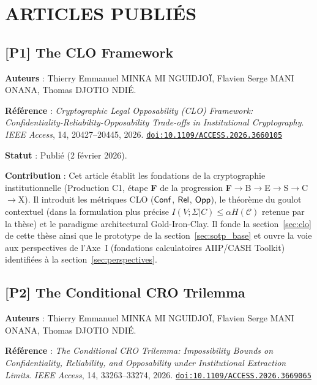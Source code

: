\section{ARTICLES PUBLI\'ES}
\label{sec:publications_publies}
\begin{sloppypar}
\subsection{[P1] The CLO Framework}

\noindent\textbf{Auteurs} : Thierry Emmanuel MINKA MI NGUIDJO\"{I},
Flavien Serge MANI ONANA, Thomas DJOTIO NDI\'E.

\noindent\textbf{R\'ef\'erence} : \textit{Cryptographic Legal Opposability (CLO) 
Framework: Confidentiality-Reliability-Opposability Trade-offs in Institutional 
Cryptography}. \textit{IEEE Access}, 14, 20427--20445, 2026.
\href{https://doi.org/10.1109/ACCESS.2026.3660105}{\texttt{doi:10.1109/ACCESS.2026.3660105}}

\noindent\textbf{Statut} : Publi\'e (2 f\'evrier 2026).

\noindent\textbf{Contribution} : Cet article \'etablit les fondations de la 
cryptographie institutionnelle (Production C1, \'etape \textbf{F} de la progression
\textbf{F}$\to$B$\to$E$\to$S$\to$C$\to$X). Il introduit les m\'etriques CLO ($\mathsf{Conf}$, $\mathsf{Rel}$, $\mathsf{Opp}$), 
le th\'eor\`eme du goulot contextuel (dans la formulation plus pr\'ecise
$I(V;\Sigma|C) \leq \alpha H(\mathcal{C})$ retenue par la th\`ese)
et le paradigme architectural Gold-Iron-Clay. Il fonde la section~\ref{sec:clo}
de cette th\`ese ainsi que le prototype de la section~\ref{sec:sotp_base} et ouvre la voie aux perspectives de l'Axe~I 
(fondations calculatoires AIIP/CASH Toolkit) identifi\'ees \`a la section~\ref{sec:perspectives}.

\vspace{0.5cm}

\subsection{[P2] The Conditional CRO Trilemma}

\noindent\textbf{Auteurs} : Thierry Emmanuel MINKA MI NGUIDJO\"{I},
Flavien Serge MANI ONANA, Thomas DJOTIO NDI\'E.

\noindent\textbf{R\'ef\'erence} : \textit{The Conditional CRO Trilemma: 
Impossibility Bounds on Confidentiality, Reliability, and Opposability 
under Institutional Extraction Limits}. \textit{IEEE Access}, 14, 33263--33274, 2026.
\href{https://doi.org/10.1109/ACCESS.2026.3669065}{\texttt{doi:10.1109/ACCESS.2026.3669065}}


\end{sloppypar}
